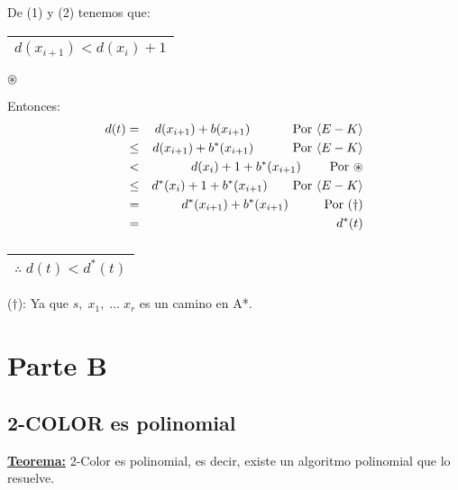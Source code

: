 \documentclass[12pt,a4paper]{report}
\begin{document}
\begin{enumerate}
\begin{enumerate}[a)]
								\vspace{5mm}
								\par De (1) y (2) tenemos que: \begin{tabular}{|c|} \hline $d(x_{i+1}) < d(x_{i}) +1 $ \\ \hline \end{tabular} $\circledast$

								\vspace{3mm}
								\par Entonces:
								\begin{eqnarray}
									\nonumber d(t) &=& d(x_{i + 1}) + b(x_{i + 1}) \qquad\;\;\;\;\; \textup{Por } \langle E-K\rangle \\
									\nonumber &\leq & d(x_{i + 1}) + b^{*}(x_{i + 1}) \qquad\;\;\;\; \textup{Por } \langle E-K\rangle \\
									\nonumber &<& d(x_{i}) + 1 + b^{*}(x_{i + 1}) \qquad\; \textup{Por } \circledast \\
									\nonumber &\leq & d^{*}(x_{i}) + 1 + b^{*}(x_{i + 1}) \qquad \textup{Por } \langle E-K\rangle \\
									\nonumber &=& d^{*}(x_{i + 1}) + b^{*}(x_{i + 1}) \qquad\;\;\; \textup{Por } (\dag) \\
									\nonumber &=& d^{*}(t)
								\end{eqnarray}
								$\qquad\qquad\qquad\;\;\;$
								\begin{tabular}{|c|} \hline $\therefore \; d(t) < d^{*}(t)$ \\ \hline \end{tabular}

								\vspace{5mm}
								\par ($\dag$): Ya que $s, \; x_{1}, \; \dotsc \; x_{r}$ es un camino en A*.
						\end{enumerate}
			\end{enumerate}



\chapter{Parte B}

	\section{2-COLOR es polinomial}
		\textbf{\underline{Teorema:}} 2-Color es polinomial, es decir, existe un algoritmo polinomial que lo resuelve.
\end{document}
